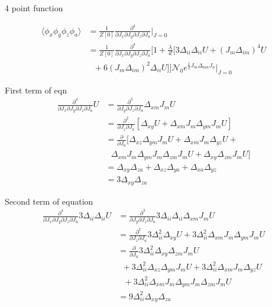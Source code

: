 \documentclass[12pt, letterpaper]{article}
\author{Noor E Mustafa Ferdous}
\title{}
\date{}
\newcommand*{\1}{\hspace{1pt}}
\begin{document}
    4 point function 
    
    \begin{equation}
    \begin{split}
        \langle \phi_{x}\phi_{y}\phi_{z}\phi_{a} \rangle & = \frac{1}{Z[0]}\frac{\partial ^{4}}{{\partial J_{x}\partial J_{y}\partial J_{z}\partial J_{a}}}\Biggr|_{J=0} \\
        & =\frac{1}{Z[0]}\frac{\partial ^{4}}{{\partial J_{x}\partial J_{y}\partial J_{z}\partial J_{a}}} [1+\frac{\lambda}{4!}[3\Delta_{ii}\Delta_{ii}U + (J_{m}\Delta_{im})^{4} U \\
        & \ \ \  + 6(J_{m}\Delta_{im})^{2}\Delta_{ii} U]]\mathcal{N}_{0} e^{\frac{1}{2} J_{m} \Delta _{mn} J_{n}}\Biggr|_{J=0}
    \end{split}
    \end{equation}
    
    First term of eqn
    \begin{align*}
        \frac{\partial ^{4}}{\partial J_{x}\partial J_{y}\partial J_{z} \partial J_{a}}U & =\frac{\partial ^{3}}{{\partial J_{y}\partial J_{z}\partial J_{a}}} \Delta_{xm}J_{m}U \\
         & = \frac{\partial ^{2}}{\partial J_{z}\partial J_{a}}[\Delta_{xy}U + \Delta_{xm}J_{m}\Delta_{ym}J_{m}U] \\ 
         & = \frac{\partial}{\partial J_{a}}[\Delta_{xz}\Delta_{ym}J_{m}U + \Delta_{xm}J_{m}\Delta_{yz}U + \\ 
         & \ \ \ \Delta_{xm}J_{m}\Delta_{ym}J_{m}\Delta_{zm}J_{m}U  + \Delta_{xy}\Delta_{zm}J_{m}U] \\ 
         & = \Delta_{xy}\Delta_{za} + \Delta_{xz}\Delta_{ya} + \Delta_{xa}\Delta_{yz} \tag*{putting J=0} \\ 
         & = 3 \Delta_{xy}\Delta_{za}
    \end{align*}
    
    Second term of equation 
    \begin{align*}
        \frac{\partial ^{4}}{{\partial J_{x}\partial J_{y}\partial J_{z}\partial J_{a}}}3\Delta_{ii}\Delta_{ii}U & = \frac{\partial ^{3}}{{\partial J_{y}\partial J_{z}\partial J_{a}}} 3\Delta_{ii}\Delta_{ii}\Delta_{xm}J_{m}U \\ 
        & =\frac{\partial ^{2}}{\partial J_{z}\partial J_{a}} 3\Delta_{ii}^{2}\Delta_{xy}U + 3\Delta_{ii}^{2}\Delta_{xm}J_{m}\Delta_{ym}J_{m}U \\
        & = \frac{\partial}{\partial J_{a}}3\Delta_{ii}^{2}\Delta_{xy}\Delta_{zm}J_{m}U   \\ 
        & \ \ + 3\Delta_{ii}^{2}\Delta_{xz}\Delta_{ym}J_{m}U + 3\Delta_{ii}^{2}\Delta_{xm}J_{m}\Delta_{yz}U \\ 
        & \ \ \ + 3\Delta_{ii}^{2}\Delta_{xm}J_{m}\Delta_{ym}J_{m}\Delta_{zm}J_{m}U \\ 
        & = 9\Delta_{ii}^{2}\Delta_{xy}\Delta_{za}
    \end{align*}
    
\end{document}
